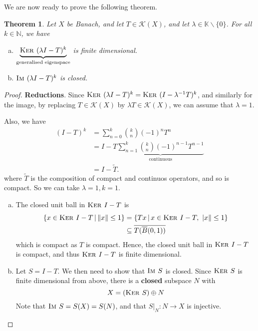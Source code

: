 \documentclass[10pt, oneside, reqno]{amsbook}
\theoremstyle{plain}%
\newtheorem{thm}{Theorem}[section]
\theoremstyle{definition}
\theoremstyle{remark}
\newcommand{\given}{ \, | \,}
\newcommand{\K}{\mathbb{K}}
\newcommand{\N}{\mathbb{N}}
\newcommand{\im}{\textsc{Im\ }}
\renewcommand{\ker}{\textsc{Ker\ }}
\begin{document}
We are now ready to prove the following theorem.

\begin{thm}
    Let $X$ be Banach, and let $T \in \mathcal K(X)$, and let $\lambda \in \K \backslash \{ 0 \}$.  For all $k \in \N$, we have \begin{enumerate}[(a)]
        \item $\underbrace{\ker(\lambda I - T)^k}_{\text{generalised eigenspace}}$ is finite dimensional.
        \item $\im(\lambda I - T)^k$ is closed.   
    \end{enumerate}
\end{thm}
\begin{proof}
    \textbf{Reductions}.  Since $\ker(\lambda I - T)^k = \ker(I - \lambda^{-1}T)^k$, and similarly for the image, by replacing $T \in \mathcal K(X)$ by $\lambda T \in \mathcal K(X)$, we can assume that $\lambda = 1$.
    
    Also, we have \begin{align*}
        (I - T)^k   &= \sum_{n=0}^k {k \choose n} (-1)^n T^n \\
                    &= I - T \underbrace{\sum_{n = 1}^k {k \choose n} (-1)^{n-1} T^{n-1}}_\text{continuous}  \\
                    &= I - \tilde T.
    \end{align*} where $\tilde T$ is the composition of compact and continuos operators, and so is compact.  So we can take $\lambda = 1, k = 1$.  
    
    \begin{enumerate}[(a)]
        \item The closed unit ball in $\ker I - T$ is \begin{align*}
        \{ x \in \ker I - T \given \| x \| \leq 1 \} &= \{ Tx \given x \in \ker I - T, \ | x \| \leq 1 \} \\
        &\subseteq \overline{T (\overline B(0, 1))}
        \end{align*} which is compact as $T$ is compact.  Hence, the closed unit ball in $\ker I - T$ is compact, and thus $\ker I - T$ is finite dimensional.
        \item Let $S = I - T$.  We then need to show that $\im S$ is closed.  Since $\ker S$ is finite dimensional from above, there is a \textbf{closed} subspace $N$ with \[
            X = (\ker S) \oplus N
        \]  Note that $\im S = S(X) = S(N)$, and that $S |_N : N \rightarrow X$ is injective. 
        

\end{enumerate}
\end{proof}
\end{document}
